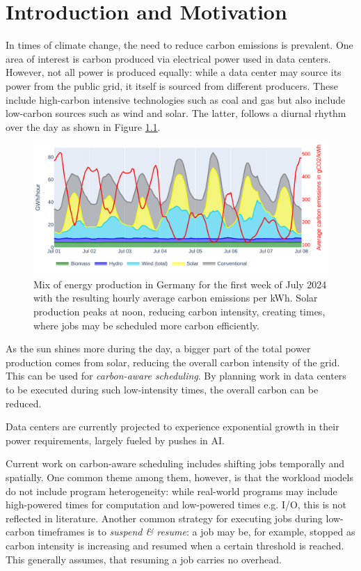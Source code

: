 \chapter{Introduction and Motivation}

In times of climate change, the need to reduce carbon emissions is prevalent. 
One area of interest is carbon produced via electrical power used in data centers. 
However, not all power is produced equally: while a data center may source its power from the public grid, it itself is sourced from different producers. 
These include high-carbon intensive technologies such as coal and gas but also include low-carbon sources such as wind and solar. 
The latter, follows a diurnal rhythm over the day as shown in Figure \ref{fig:energy_mix}.

\begin{figure}
    \includegraphics[width=\linewidth]{agorameter/energy_production_week.pdf}
    \caption[short]{Mix of energy production in Germany for the first week of July 2024 with the resulting hourly average carbon emissions per kWh. Solar production peaks at noon, reducing carbon intensity, creating times, where jobs may be scheduled more carbon efficiently.}
    \label{fig:energy_mix}
\end{figure}

As the sun shines more during the day, a bigger part of the total power production comes from solar, reducing the overall carbon intensity of the grid.
This can be used for \emph{carbon-aware scheduling}. 
By planning work in data centers to be executed during such low-intensity times, the overall carbon can be reduced.

Data centers are currently projected to experience exponential growth in their power requirements, largely fueled by pushes in AI.\cite{schwartz_green_2019}

Current work on carbon-aware scheduling includes shifting jobs temporally and spatially. 
One common theme among them, however, is that the workload models do not include program heterogeneity: while real-world programs may include high-powered times for computation and low-powered times e.g. I/O, this is not reflected in literature. 
Another common strategy for executing jobs during low-carbon timeframes is to \emph{suspend \& resume}: a job may be, for example, stopped as carbon intensity is increasing and resumed when a certain threshold is reached. 
This generally assumes, that resuming a job carries no overhead. 

